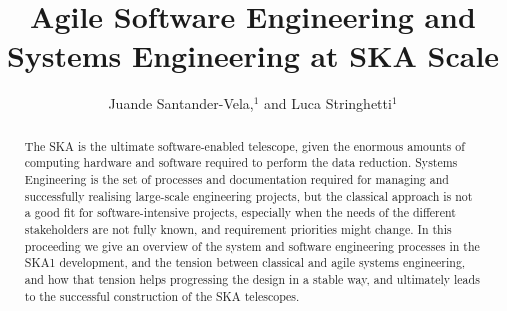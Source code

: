 \documentclass[11pt,twoside]{article}
\begin{document}
\title{Agile Software Engineering and Systems Engineering at SKA Scale}

\author{Juande Santander-Vela,$^1$ and Luca Stringhetti$^1$
}


\begin{abstract}
The SKA is the ultimate software-enabled telescope, given the enormous amounts of computing hardware and software required to perform the data reduction. Systems Engineering is the set of processes and documentation required for managing and successfully realising large-scale engineering projects, but the classical approach is not a good fit for software-intensive projects, especially when the needs of the different stakeholders are not fully known, and requirement priorities might change. In this proceeding we give an overview of the system and software engineering processes in the SKA1 development, and the tension between classical and agile systems engineering, and how that tension helps progressing the design in a stable way, and ultimately leads to the successful construction of the SKA telescopes.
\end{abstract}

\end{document}
